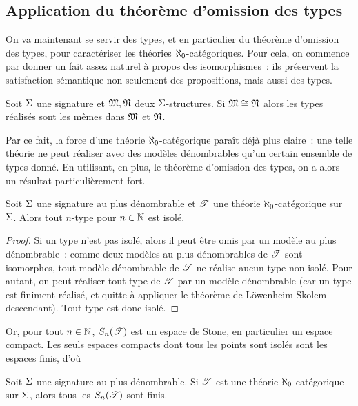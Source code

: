 \subsection{Application du théorème d'omission des types}

On va maintenant se servir des types, et en particulier du théorème d'omission
des types, pour caractériser les théories $\aleph_0$-catégoriques. Pour cela, on
commence par donner un fait assez naturel à propos des isomorphismes~: ils
préservent la satisfaction sémantique non seulement des propositions, mais
aussi des types.

\begin{claim}
  Soit $\Sigma$ une signature et $\mathfrak{M},\mathfrak{N}$ deux $\Sigma$-structures. Si
  $\mathfrak{M}\cong\mathfrak{N}$ alors les types réalisés sont les mêmes dans $\mathfrak{M}$ et
  $\mathfrak{N}$.
\end{claim}

Par ce fait, la force d'une théorie $\aleph_0$-catégorique paraît déjà plus
claire~: une telle théorie ne peut réaliser avec des modèles dénombrables
qu'un certain ensemble de types donné. En utilisant, en plus, le théorème
d'omission des types, on a alors un résultat particulièrement fort.

\begin{proposition}
  Soit $\Sigma$ une signature au plus dénombrable et $\mathscr T$ une théorie
  $\aleph_0$-catégorique sur $\Sigma$. Alors tout $n$-type pour $n \in \mathbb N$ est
  isolé.
\end{proposition}

\begin{proof}
  Si un type n'est pas isolé, alors il peut être omis par un modèle au plus
  dénombrable~: comme deux modèles au plus dénombrables de $\mathscr T$ sont
  isomorphes, tout modèle dénombrable de $\mathscr T$ ne réalise aucun type non
  isolé. Pour autant, on peut réaliser tout type de $\mathscr T$ par un modèle
  dénombrable (car un type est finiment réalisé, et quitte à appliquer le
  théorème de Löwenheim-Skolem descendant). Tout type est donc isolé.
\end{proof}

Or, pour tout $n\in \mathbb N$, $S_{n}(\mathscr T)$ est un espace de Stone, en
particulier un espace compact. Les seuls espaces compacts dont tous les points
sont isolés sont les espaces finis, d'où

\begin{corollary}
  Soit $\Sigma$ une signature au plus dénombrable.
  Si $\mathscr T$ est une théorie $\aleph_0$-catégorique sur $\Sigma$, alors tous les
  $S_{n}(\mathscr T)$ sont finis.
\end{corollary}

